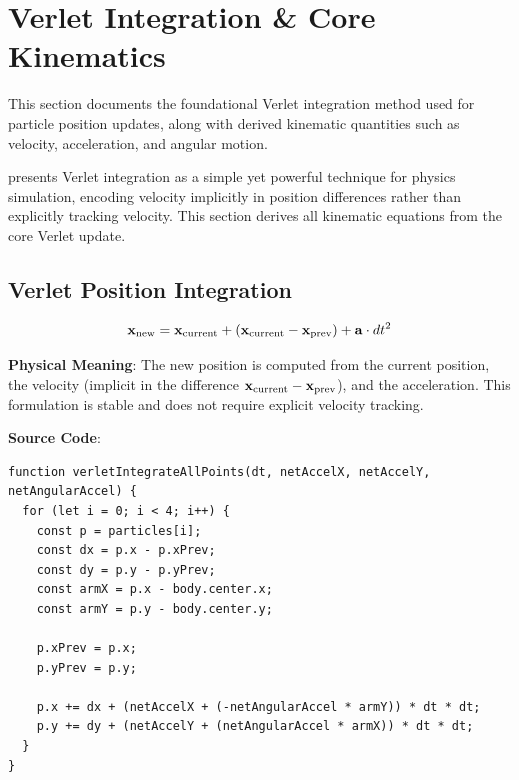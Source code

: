 \section{Verlet Integration \& Core Kinematics}

This section documents the foundational Verlet integration method used for particle position updates, along with derived kinematic quantities such as velocity, acceleration, and angular motion.

\cite{jakobsen2001advanced} presents Verlet integration as a simple yet powerful technique for physics simulation, encoding velocity implicitly in position differences rather than explicitly tracking velocity. This section derives all kinematic equations from the core Verlet update.

\subsection{Verlet Position Integration}

\begin{equation}
  \mathbf{x}_{\text{new}} = \mathbf{x}_{\text{current}} + (\mathbf{x}_{\text{current}} - \mathbf{x}_{\text{prev}}) + \mathbf{a} \cdot dt^2
  \label{eq:verlet-position}
\end{equation}

\textbf{Physical Meaning}: The new position is computed from the current position, the velocity (implicit in the difference $\mathbf{x}_{\text{current}} - \mathbf{x}_{\text{prev}}$), and the acceleration. This formulation is stable and does not require explicit velocity tracking.

\textbf{Source Code}: 

\begin{lstlisting}[caption={Verlet position update with rotational displacement}]
function verletIntegrateAllPoints(dt, netAccelX, netAccelY, netAngularAccel) {
  for (let i = 0; i < 4; i++) {
    const p = particles[i];
    const dx = p.x - p.xPrev;
    const dy = p.y - p.yPrev;
    const armX = p.x - body.center.x;
    const armY = p.y - body.center.y;

    p.xPrev = p.x;
    p.yPrev = p.y;

    p.x += dx + (netAccelX + (-netAngularAccel * armY)) * dt * dt;
    p.y += dy + (netAccelY + (netAngularAccel * armX)) * dt * dt;
  }
}
\end{lstlisting}

